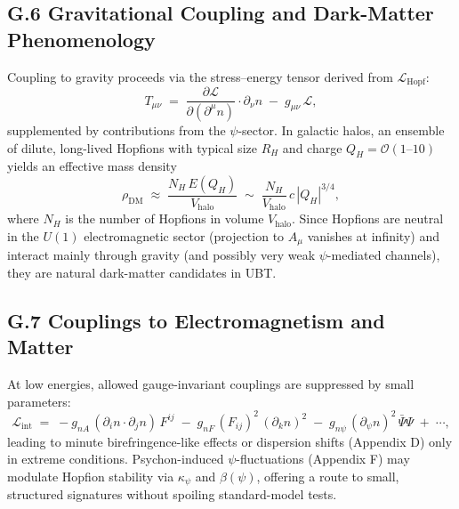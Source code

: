 \documentclass[12pt,a4paper]{article}
\begin{document}
\subsection*{G.6 Gravitational Coupling and Dark-Matter Phenomenology}
Coupling to gravity proceeds via the stress--energy tensor derived from $\mathcal{L}_{\mathrm{Hopf}}$:
\begin{equation}
T_{\mu\nu} \;=\; \frac{\partial \mathcal{L}}{\partial(\partial^\mu n)}\cdot \partial_\nu n \;-\; g_{\mu\nu}\,\mathcal{L},
\end{equation}
supplemented by contributions from the $\psi$-sector. 
In galactic halos, an ensemble of dilute, long-lived Hopfions with typical size $R_H$ and charge $Q_H=\mathcal{O}(1\text{--}10)$ yields an effective mass density
\begin{equation}
\rho_{\mathrm{DM}} \;\approx\; \frac{N_H\, E(Q_H)}{V_{\mathrm{halo}}} \;\sim\; \frac{N_H}{V_{\mathrm{halo}}}\, c\, |Q_H|^{3/4},
\end{equation}
where $N_H$ is the number of Hopfions in volume $V_{\mathrm{halo}}$. 
Since Hopfions are neutral in the $U(1)$ electromagnetic sector (projection to $A_\mu$ vanishes at infinity) and interact mainly through gravity (and possibly very weak $\psi$-mediated channels), they are natural dark-matter candidates in UBT.

\subsection*{G.7 Couplings to Electromagnetism and Matter}
At low energies, allowed gauge-invariant couplings are suppressed by small parameters:
\begin{equation}
\mathcal{L}_{\mathrm{int}} \;=\; - g_{nA}\, ( \partial_i n \cdot \partial_j n )\, F^{ij} \;-\; g_{nF}\, (F_{ij})^2\, ( \partial_k n )^2 \;-\; g_{n\psi}\, (\partial_\psi n)^2\, \bar{\Psi}\Psi \;+\; \cdots,
\end{equation}
leading to minute birefringence-like effects or dispersion shifts (Appendix D) only in extreme conditions. 
Psychon-induced $\psi$-fluctuations (Appendix F) may modulate Hopfion stability via $\kappa_\psi$ and $\beta(\psi)$, offering a route to small, structured signatures without spoiling standard-model tests.
\end{document}
